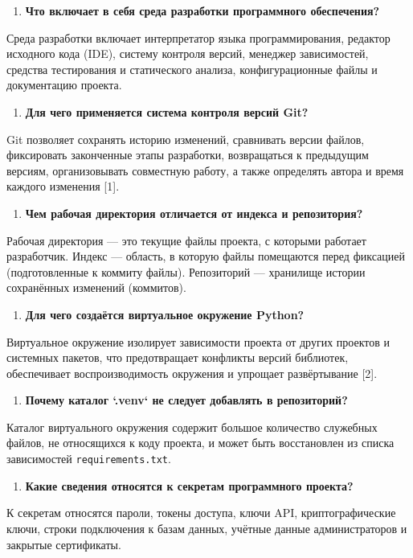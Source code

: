 \documentclass[12pt,a4paper]{article}
\begin{document}
\begin{enumerate}
\item \textbf{Что включает в себя среда разработки программного обеспечения?}
\end{enumerate}
Среда разработки включает интерпретатор языка программирования, редактор исходного кода (IDE), систему контроля версий, менеджер зависимостей, средства тестирования и статического анализа, конфигурационные файлы и документацию проекта.

\begin{enumerate}
\item \textbf{Для чего применяется система контроля версий Git?}
\end{enumerate}
Git позволяет сохранять историю изменений, сравнивать версии файлов, фиксировать законченные этапы разработки, возвращаться к предыдущим версиям, организовывать совместную работу, а также определять автора и время каждого изменения [1].

\begin{enumerate}
\item \textbf{Чем рабочая директория отличается от индекса и репозитория?}
\end{enumerate}
Рабочая директория — это текущие файлы проекта, с которыми работает разработчик. Индекс — область, в которую файлы помещаются перед фиксацией (подготовленные к коммиту файлы). Репозиторий — хранилище истории сохранённых изменений (коммитов).

\begin{enumerate}
\item \textbf{Для чего создаётся виртуальное окружение Python?}
\end{enumerate}
Виртуальное окружение изолирует зависимости проекта от других проектов и системных пакетов, что предотвращает конфликты версий библиотек, обеспечивает воспроизводимость окружения и упрощает развёртывание [2].

\begin{enumerate}
\item \textbf{Почему каталог `.venv` не следует добавлять в репозиторий?}
\end{enumerate}
Каталог виртуального окружения содержит большое количество служебных файлов, не относящихся к коду проекта, и может быть восстановлен из списка зависимостей \texttt{requirements.\allowbreak{}txt}.

\begin{enumerate}
\item \textbf{Какие сведения относятся к секретам программного проекта?}
\end{enumerate}
К секретам относятся пароли, токены доступа, ключи API, криптографические ключи, строки подключения к базам данных, учётные данные администраторов и закрытые сертификаты.
\end{document}
